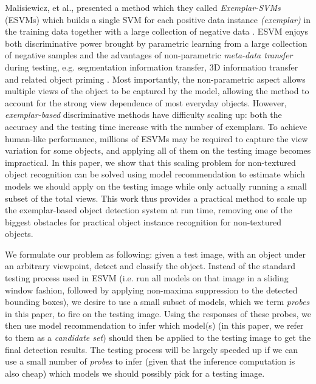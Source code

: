 \documentclass{article} %
\begin{document}
Malisiewicz, et al., presented a method which they called \emph{Exemplar-SVMs} (ESVMs) which builds a single SVM for each positive data instance \emph{(exemplar)} in the training data together with a large collection of negative data \cite{malisiewicz2011ensemble}. ESVM enjoys both discriminative power brought by parametric learning from a large collection of negative samples and the advantages of non-parametric \emph{meta-data transfer} during testing, e.g. segmentation information transfer, 3D information transfer and related object priming \cite{malisiewicz2011ensemble}. Most importantly, the non-parametric aspect allows multiple views of the object to be captured by the model, allowing the method to account for the strong view dependence of most everyday objects. However, \emph{exemplar-based} discriminative methods have difficulty scaling up: both the accuracy and the testing time increase with the number of exemplars. To achieve human-like performance, millions of ESVMs may be required to capture the view variation for some objects, and applying all of them on the testing image becomes impractical. In this paper, we show that this scaling problem for non-textured object recognition can be solved using model recommendation to estimate which models we should apply on the testing image while only actually running a small subset of the total views. This work thus provides a practical method to scale up the exemplar-based object detection system at run time, removing one of the biggest obstacles for practical object instance recognition for non-textured objects.

We formulate our problem as following: given a test image, with an object under an arbitrary viewpoint, detect and classify the object. Instead of the standard testing process used in ESVM (i.e. run all models on that image in a sliding window fashion, followed by applying non-maxima suppression to the detected bounding boxes), we desire to use a small subset of models, which we term \emph{probes} in this paper, to fire on the testing image. Using the responses of these probes, we then use model recommendation to infer which model(s) (in this paper, we refer to them as a \emph{candidate set}) should then be applied to the testing image to get the final detection results. The testing process will be largely speeded up if we can use a small number of \emph{probes} to infer (given that the inference computation is also cheap) which models we should possibly pick for a testing image. 
\end{document}

